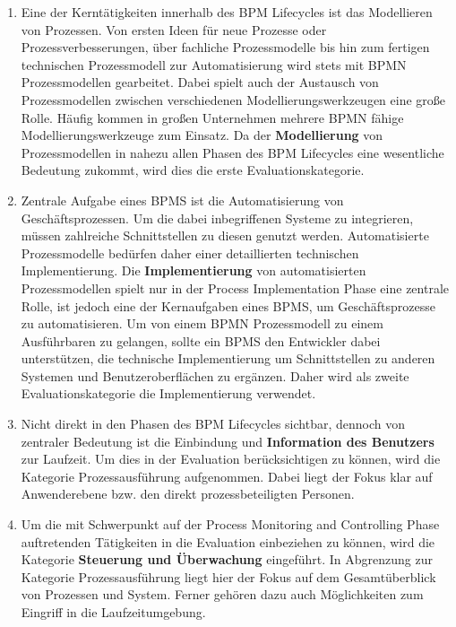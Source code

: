 \begin{enumerate}[label=\bfseries\arabic*]
\item Eine der Kerntätigkeiten innerhalb des \ac{BPM} Lifecycles ist das Modellieren von Prozessen. Von ersten Ideen für neue Prozesse oder Prozessverbesserungen, über fachliche Prozessmodelle bis hin zum fertigen technischen Prozessmodell zur Automatisierung wird stets mit \ac{BPMN} Prozessmodellen gearbeitet. Dabei spielt auch der Austausch von Prozessmodellen zwischen verschiedenen Modellierungswerkzeugen eine große Rolle. Häufig kommen in großen Unternehmen mehrere \ac{BPMN} fähige Modellierungswerkzeuge zum Einsatz. Da der \textbf{Modellierung} von Prozessmodellen in nahezu allen Phasen des \ac{BPM} Lifecycles eine wesentliche  Bedeutung zukommt, wird dies die erste Evaluationskategorie.

\item Zentrale Aufgabe eines \ac{BPMS} ist die Automatisierung von Geschäftsprozessen. Um die dabei inbegriffenen Systeme zu integrieren, müssen zahlreiche Schnittstellen zu diesen genutzt werden. Automatisierte Prozessmodelle bedürfen daher einer detaillierten technischen Implementierung. Die \textbf{Implementierung} von automatisierten Prozessmodellen spielt nur in der Process Implementation Phase eine zentrale Rolle, ist jedoch eine der Kernaufgaben eines \ac{BPMS}, um Geschäftsprozesse zu automatisieren. Um von einem \ac{BPMN} Prozessmodell zu einem Ausführbaren zu gelangen, sollte ein \ac{BPMS} den Entwickler dabei unterstützen, die technische Implementierung um Schnittstellen zu anderen Systemen und Benutzeroberflächen zu ergänzen. Daher wird als zweite Evaluationskategorie die Implementierung verwendet.

\item Nicht direkt in den Phasen des \ac{BPM} Lifecycles sichtbar, dennoch von zentraler Bedeutung ist die Einbindung und \textbf{Information des Benutzers} zur Laufzeit. Um dies in der Evaluation berücksichtigen zu können, wird die Kategorie Prozessausführung aufgenommen. Dabei liegt der Fokus klar auf Anwenderebene bzw. den direkt prozessbeteiligten Personen.

\newpage
\item Um die mit Schwerpunkt auf der Process Monitoring and Controlling Phase auftretenden Tätigkeiten in die Evaluation einbeziehen zu können, wird die Kategorie \textbf{Steuerung und Überwachung} eingeführt. In Abgrenzung zur Kategorie Prozessausführung liegt hier der Fokus auf dem Gesamtüberblick von Prozessen und System. Ferner gehören dazu auch Möglichkeiten zum Eingriff in die Laufzeitumgebung.


\end{enumerate}
